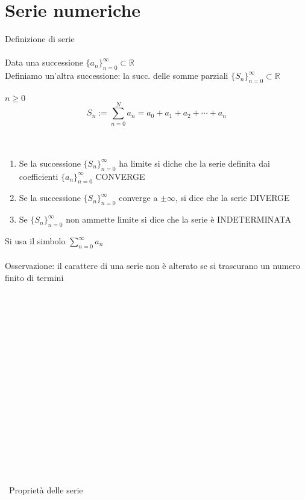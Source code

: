 \documentclass{article}
\begin{document}
\section{Serie numeriche}
{\large Definizione di serie}\\\\
Data una successione \(\{a_n\}^\infty_{n=0} \subset \mathbb{R}\)\\
Definiamo un'altra successione: la succ. delle somme parziali \(\{S_n\}^\infty_{n=0} \subset \mathbb{R}\)\\\\
\(n\ge0\)\\
\[S_n:=\sum^N_{n=0}a_n=a_0+a_1+a_2+\cdots+a_n\]\\\\
\begin{enumerate}
    \item Se la successione \(\{S_n\}^\infty_{n=0}\) ha limite si diche che la serie definita dai coefficienti \(\{a_n\}^\infty_{n=0}\) CONVERGE
    \item Se la successione \(\{S_n\}^\infty_{n=0}\) converge a \(\pm\infty\), si dice che la serie DIVERGE
    \item Se \(\{S_n\}^\infty_{n=0}\) non ammette limite si dice che la serie è INDETERMINATA 
\end{enumerate}
Si usa il simbolo \(\sum^\infty_{n=0}a_n\)\\\\
Osservazione: il carattere di una serie non è alterato se si trascurano un numero finito di termini\\\\\\\\\\\\\\\\\\\\\\\\\\\\\\\\\\\\\
{\Large Proprietà delle serie}\\\\
\end{document}
